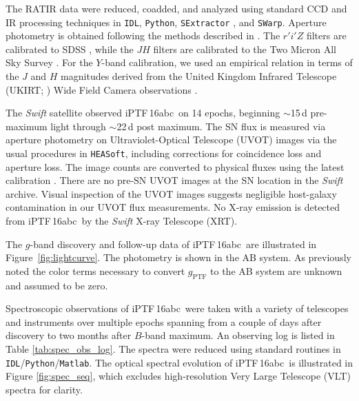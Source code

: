 \documentclass[twocolumn]{aastex61}
\newcommand{\abc}{iPTF\,16abc}
\begin{document}
The RATIR data were reduced, coadded, and analyzed using standard CCD and IR processing techniques in \texttt{IDL}, \texttt{Python}, \texttt{SExtractor} \citep{1996A&AS..117..393B}, and \texttt{SWarp}. Aperture photometry is obtained following the methods described in \citet{2014AJ....148....2L}. The $r'i'Z$ filters are calibrated to SDSS \citep{2014ApJS..211...17A}, while the $JH$ filters are calibrated to the Two Micron All Sky Survey \citep{2006AJ....131.1163S}. For the $Y$-band calibration, we used an empirical relation in terms of the $J$ and $H$ magnitudes derived from the United Kingdom Infrared Telescope (UKIRT; \citealt{2007A&A...467..777C}) Wide Field Camera observations \citep{2009MNRAS.394..675H}.

The \textit{Swift} satellite observed \abc\ on 14 epochs, beginning 
$\sim$15\,d pre-maximum light through $\sim$22\,d post maximum. The SN 
flux is measured via aperture photometry on Ultraviolet-Optical
Telescope (UVOT) images via the usual procedures in 
\texttt{HEASoft}, including corrections for coincidence loss and 
aperture loss. The image counts
are converted to physical fluxes using the latest calibration
\citep{2011AIPC.1358..373B}. There are no pre-SN UVOT images at the 
SN location in the \textit{Swift} archive.  Visual inspection of the
UVOT images suggests negligible host-galaxy contamination in our 
UVOT flux measurements. No X-ray emission is detected from \abc\ by the \textit{Swift} X-ray Telescope (XRT).

The $g$-band discovery and follow-up data of \abc\ are 
illustrated in Figure~\ref{fig:lightcurve}.  The photometry is shown in the AB system. As previously noted the color terms necessary to convert $g_\mathrm{PTF}$ to the AB system are unknown and assumed to be zero.

Spectroscopic observations of \abc\ were taken with a variety
of telescopes and instruments over multiple epochs spanning from a
couple of days after discovery to two months after $B$-band maximum. 
An observing log is listed in Table \ref{tab:spec_obs_log}. The spectra were reduced using standard routines in \texttt{IDL}/\texttt{Python}/\texttt{Matlab}. The optical
spectral evolution of \abc\ is illustrated in Figure
\ref{fig:spec_seq}, which excludes high-resolution Very Large Telescope (VLT) spectra for clarity.
\end{document}
